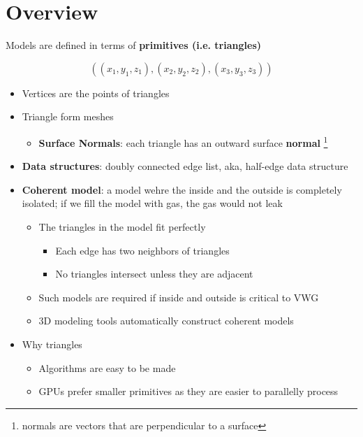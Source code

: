 \chapter{Overview}\label{chapter: model}

Models are defined in terms of \textbf{primitives (i.e. triangles)}

\begin{equation}
  \left(
    \left( x_{1}, y_{1}, z_{1} \right),
    \left( x_{2}, y_{2}, z_{2} \right),
    \left( x_{3}, y_{3}, z_{3} \right)
  \right)
\end{equation}

\begin{itemize}
  \item Vertices are the points of triangles
  \item Triangle form meshes
  \begin{itemize}
    \item \textbf{Surface Normals}: each triangle has an outward surface
    \textbf{normal} \footnote{normals are vectors that are perpendicular to a
    surface}
  \end{itemize}
  \item \textbf{Data structures}: doubly connected edge list, aka, half-edge
  data structure

  \item \textbf{Coherent model}: a model wehre the inside and the outside is
  completely isolated; if we fill the model with gas, the gas would not leak
  \begin{itemize}
    \item The triangles in the model fit perfectly
    \begin{itemize}
      \item Each edge has two neighbors of triangles
      \item No triangles intersect unless they are adjacent
    \end{itemize}

    \item Such models are required if inside and outside is critical to VWG
    \item 3D modeling tools automatically construct coherent models
  \end{itemize}

  \item Why triangles
  \begin{itemize}
    \item Algorithms are easy to be made
    \item GPUs prefer smaller primitives as they are easier to parallelly
    process
  \end{itemize}


\end{itemize}
